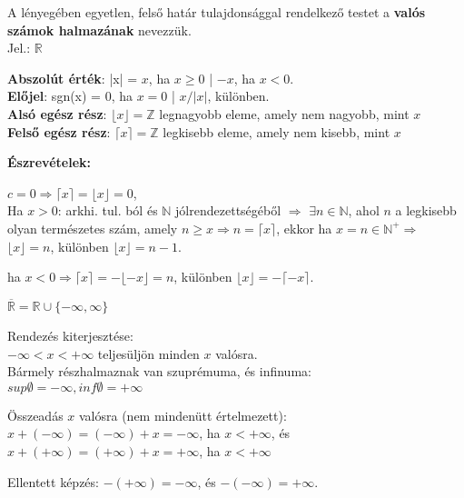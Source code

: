 \begin{frame}
\begin{tcolorbox}[title={Def.: Valós számok halmaza}]
  A lényegében egyetlen, felső határ tulajdonsággal rendelkező testet a \textbf{valós számok halmazának} nevezzük.\\
  Jel.: $\mathbb{R}$
\end{tcolorbox}

\begin{tcolorbox}[title={Def.: néhány Függvény (?)}]
  \textbf{Abszolút érték}: |x| = $x$, ha $x \geq 0$ | $-x$, ha $x < 0$.\\
  \textbf{Előjel}: sgn(x) = $0$, ha $x = 0$ | $x / |x|$, különben.\\
  \textbf{Alsó egész rész}: ${\lfloor}x{\rfloor} = \mathbb{Z}$ legnagyobb eleme, amely nem nagyobb, mint $x$\\
  \textbf{Felső egész rész}: ${\lceil}x{\rceil} = \mathbb{Z}$ legkisebb eleme, amely nem kisebb, mint $x$\\
  \mbigskip

  \textbf{Észrevételek:}\\
  \mmedskip

  $c = 0 \Rightarrow {\lceil}x{\rceil} = {\lfloor}x{\rfloor} = 0$,\\
  Ha $x > 0$: arkhi. tul. ból és $\mathbb{N}$ jólrendezettségéből $\Rightarrow$ ${\exists}n \in \mathbb{N}$, ahol $n$ a legkisebb olyan természetes szám, amely $n \geq x \Rightarrow n = {\lceil}x{\rceil}$, ekkor ha $x = n \in \mathbb{N}^+ \Rightarrow$ ${\lfloor}x{\rfloor} = n$, különben ${\lfloor}x{\rfloor} = n - 1$.\\
  \mmedskip

  ha $x < 0 \Rightarrow {\lceil}x{\rceil} = -{\lfloor}-x{\rfloor} = n$, különben ${\lfloor}x{\rfloor} = -{\lceil}-x{\rceil}$.
\end{tcolorbox}
\end{frame}


\begin{frame}
\begin{tcolorbox}[title={Def.: Bővített valós számok}]
  $\overline{\mathbb{R}} = \mathbb{R} \cup \{ -{\infty}, {\infty}\}$\\
  \mbigskip

  Rendezés kiterjesztése:\\
  $-{\infty} < x < +{\infty}$ teljesüljön minden $x$ valósra.\\
  Bármely részhalmaznak van szuprémuma, és infinuma:\\
  $sup{\emptyset} = -{\infty}, inf{\emptyset} = +{\infty}$\\
  \mmedskip

  Összeadás $x$ valósra (nem mindenütt értelmezett):\\
  $x + (-{\infty}) = (-{\infty}) + x = -{\infty}$, ha $x < +{\infty}$, és $x + (+{\infty}) = (+{\infty}) + x = +{\infty}$, ha $x < +{\infty}$\\
  \mmedskip

  Ellentett képzés: $-(+{\infty}) = -{\infty}$, és $-(-{\infty}) = +{\infty}$.
\end{tcolorbox}
\end{frame}


